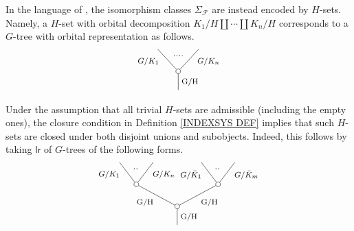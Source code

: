 \documentclass[a4paper,10pt]{article}%
\begin{document}
\begin{remark}
  In the language of \cite{BH15}, the isomorphism classes $\Sigma_{\mathcal{F}}$ are instead encoded by 
  $H$-sets. Namely, a $H$-set with orbital decomposition $K_1/H \amalg \cdots \amalg K_n/H$ corresponds to a $G$-tree with orbital representation as follows.
  \begin{equation}
    \begin{tikzpicture}
      [grow=up,auto,level distance=2.3em,every node/.style = {font=\footnotesize},dummy/.style={circle,draw,inner sep=0pt,minimum size=1.75mm}]
      \node at (0,0) {}
      child{node [dummy] {}
        child{
          edge from parent node [swap,near end] {$G/K_n$} node [name=Kn] {}}
        child{
          edge from parent node [near end] {$G/K_1$}
          node [name=Kone,swap] {}}
        edge from parent node [swap] {G/H}
      };
      \draw [dotted,thick] (Kone) -- (Kn) ;
    \end{tikzpicture}
  \end{equation}
  Under the assumption that all trivial $H$-sets are admissible (including the empty ones), the closure condition in Definition \ref{INDEXSYS DEF} implies that such $H$-sets are closed under both disjoint unions and subobjects. Indeed, this follows by taking $\mathsf{lr}$
  of $G$-trees of the following forms.
  \begin{equation}
    \begin{tikzpicture}
      [grow=up,auto,level distance=2.3em,every node/.style = {font=\footnotesize},dummy/.style={circle,draw,inner sep=0pt,minimum size=1.75mm}]
      \tikzstyle{level 2}=[sibling distance = 8.5em]
      \tikzstyle{level 3}=[sibling distance = 3.5em]
      \node at (0,0) {}
      child{node [dummy] {}
        child{node [dummy] {}
          child{
            edge from parent node [swap,near end] {$G/\bar{K}_m$} node [name=Kn] {}}
          child{
            edge from parent node [near end] {$G/\bar{K}_1$}
            node [name=Kone,swap] {}}
          edge from parent node [swap] {G/H}}
        child{node [dummy] {}
          child{
            edge from parent node [swap,near end] {$G/K_n$} node [name=K2n] {}}
          child{
            edge from parent node [near end] {$G/K_1$}
            node [name=K2one,swap] {}}
          edge from parent node {G/H}}
        edge from parent node [swap] {G/H}		
      };
      \draw [dotted,thick] (Kone) -- (Kn)	;
      \draw [dotted,thick] (K2one) -- (K2n)	;
      \begin{scope}
	\tikzstyle{level 2}=[sibling distance = 5.5em]

\end{scope}
\end{tikzpicture}
\end{equation}
\end{remark}
\end{document}
